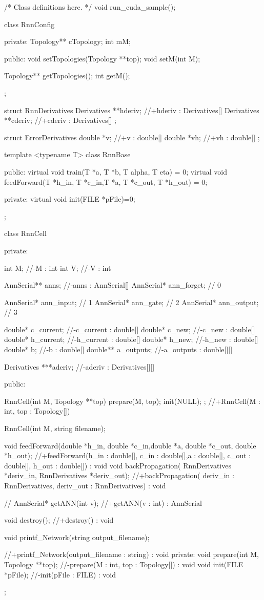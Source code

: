 /* Class definitions here. */
void run_cuda_sample();

class RnnConfig{
private:
  Topology** cTopology;
  int mM;


public:
  void setTopologies(Topology **top);
  void setM(int M);


  Topology** getTopologies();
  int getM();

};



struct RnnDerivatives {
  Derivatives **hderiv;
  //+hderiv : Derivatives[]
  Derivatives **cderiv;
  //+cderiv : Derivatives[]
};

struct ErrorDerivatives {
  double *v;
  //+v : double[]
  double *vh;
  //+vh : double[]
};

template <typename T>
class RnnBase {
  public:
  	 virtual void train(T *a, T *b, T alpha, T eta) = 0;
  	 virtual void feedForward(T *h_in, T *c_in,T *a, T *c_out, T *h_out) = 0;


  private:
     virtual	void init(FILE *pFile)=0;
};


class RnnCell {
  private:

    int M;
    //-M : int
    int V;
    //-V : int

    AnnSerial** anns;
    //-anns : AnnSerial[]
    AnnSerial* ann_forget; // 0

    AnnSerial* ann_input; // 1
    AnnSerial* ann_gate; // 2
    AnnSerial* ann_output; // 3

    double* c_current;
    //-c_current : double[]
    double* c_new;
    //-c_new : double[]
    double* h_current;
    //-h_current : double[]
    double* h_new;
    //-h_new : double[]
    double* b;
    //-b : double[]
    double** a_outputs;
    //-a_outputs : double[][]

    Derivatives ***aderiv;
    //-aderiv : Derivatives[][]




  public:

    RnnCell(int M, Topology **top) {
      prepare(M, top);
      init(NULL);
    };
    //+RnnCell(M : int, top : Topology[])


    RnnCell(int M, string filename);



  	 void feedForward(double *h_in, double *c_in,double *a, double *c_out, double *h_out);
     //+feedForward(h_in : double[], c_in : double[],a : double[], c_out : double[], h_out : double[]) : void
     void backPropagation( RnnDerivatives *deriv_in, RnnDerivatives *deriv_out);
     //+backPropagation( deriv_in : RnnDerivatives, deriv_out : RnnDerivatives) : void

    //
    AnnSerial* getANN(int v);
    //+getANN(v : int) : AnnSerial

    void destroy();
    //+destroy() : void

    void printf_Network(string output_filename);

    //+printf_Network(output_filename : string) : void
  private:
    void prepare(int M, Topology **top);
    //-prepare(M : int, top : Topology[]) : void
    void init(FILE *pFile);
    //-init(pFile : FILE) : void

};


